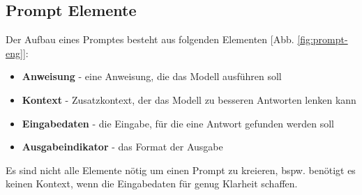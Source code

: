 \subsection{Prompt Elemente}
Der Aufbau eines Promptes besteht aus folgenden Elementen [Abb. \ref{fig:prompt-eng}]:
\begin{itemize}
    \setlength{\parskip}{1pt}
    \item \textbf{Anweisung} - eine Anweisung, die das Modell ausführen soll
    \item \textbf{Kontext} - Zusatzkontext, der das Modell zu besseren Antworten lenken kann
    \item \textbf{Eingabedaten} - die Eingabe, für die eine Antwort gefunden werden soll
    \item \textbf{Ausgabeindikator} - das Format der Ausgabe
\end{itemize}
Es sind nicht alle Elemente nötig um einen Prompt zu kreieren, bspw. benötigt es keinen Kontext, wenn die Eingabedaten für genug Klarheit schaffen. \cite*{ElementsPromptNextra2024}

